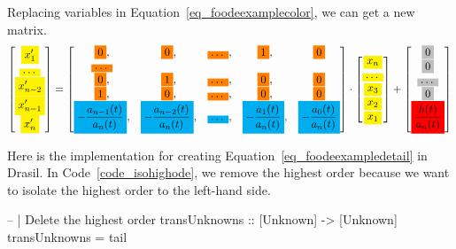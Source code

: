 Replacing variables in Equation~\ref{eq_foodeexamplecolor}, we can get a new matrix.
\begin{equation}\label{eq_foodeexampledetail}
	\begin{bmatrix}
		\highlight{yellow}{x_{1}'} \\
    \highlight{yellow}{\dots} \\
    \highlight{yellow}{x_{n-2}'} \\
    \highlight{yellow}{x_{n-1}'} \\
    \highlight{yellow}{x_{n}'}
	\end{bmatrix}
    = 
  \begin{bmatrix}
		\highlight{orange}{0}, & \highlight{orange}{0}, & \highlight{orange}{\dots}, & \highlight{orange}{1}, & \highlight{orange}{0} \\
    \highlight{orange}{\dots} \\
    \highlight{orange}{0}, & \highlight{orange}{1}, & \highlight{orange}{\dots}, & \highlight{orange}{0}, & \highlight{orange}{0} \\
    \highlight{orange}{1}, & \highlight{orange}{0}, & \highlight{orange}{\dots}, & \highlight{orange}{0}, & \highlight{orange}{0} \\
    \highlight{cyan}{-\frac{a_{n-1}(t)}{a_n(t)}}, & \highlight{cyan}{-\frac{a_{n-2}(t)}{a_n(t)}}, & \highlight{cyan}{\dots}, & \highlight{cyan}{-\frac{a_{1}(t)}{a_n(t)}}, & \highlight{cyan}{-\frac{a_{0}(t)}{a_n(t)}}
	\end{bmatrix}
    \cdot
  \begin{bmatrix}
    \highlight{yellow}{x_{n}} \\
    \highlight{yellow}{\dots} \\
    \highlight{yellow}{x_{3}} \\
		\highlight{yellow}{x_{2}} \\
    \highlight{yellow}{x_{1}}
	\end{bmatrix}
    + 
  \begin{bmatrix}
    \highlight{lightgray}{0} \\
    \highlight{lightgray}{0} \\
    \highlight{lightgray}{\dots} \\
    \highlight{lightgray}{0} \\
    \highlight{red}{\frac{h(t)}{a_n(t)}}
	\end{bmatrix}
\end{equation}

Here is the implementation for creating Equation~\ref{eq_foodeexampledetail} in Drasil. In Code~\ref{code_isohighode}, we remove the highest order because we want to isolate the highest order to the left-hand side.
\begin{listing}[ht]
\begin{haskell1}
-- | Delete the highest order
transUnknowns :: [Unknown] -> [Unknown]
transUnknowns = tail
\end{haskell1}
\label{code_isohighode}
\end{listing}


